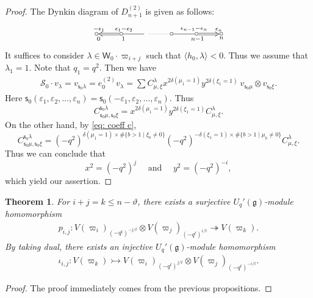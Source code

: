 \documentclass[11pt, leqno]{amsart}
\newtheorem{theorem}{Theorem}[section]
\theoremstyle{definition}
\numberwithin{equation}{section}
\begin{document}
\begin{proof}
The Dynkin diagram of $D^{(2)}_{n+1}$ is given as follows:
$$
\xymatrix@R=3ex{ *{\circ}<3pt> \ar@{<=}[r]_<{0}^{  -\epsilon_1
\qquad \ }  &*{\circ}<3pt> \ar@{-}[r]_<{1}^{\epsilon_1-\epsilon_2
\qquad \ }    & {} \ar@{.}[r] & *{\circ}<3pt> \ar@{-}[r]_>{\,\,\,\
n-1}^{ \qquad \ \epsilon_{n-1}-\epsilon_{n} }
&*{\circ}<3pt>\ar@{=>}[r]_>{\,\,\,\,n}^{ \qquad \  \epsilon_{n} }
&*{\circ}<3pt> }
$$
It suffices to consider $\lambda \in \mathsf{W}_0 \cdot {\varpi}_{i+j}$ such that
$\langle h_0, \lambda \rangle <0$. Thus we assume that $\lambda_1=1$. Note that $q_1=q^2$. Then
we have
\begin{align*}
\mathcal{S}_0 \cdot v_\lambda=v_{{\mathsf{s}}_0 \lambda}  = e_0^{(2)} v_\lambda = \sum C^{\lambda}_{\mu,\xi}
x^{2\delta(\mu_1=1)}y^{2\delta(\xi_1=1)} \ v_{{\mathsf{s}}_0 \mu} \otimes
v_{{\mathsf{s}}_0\xi}.
\end{align*}
Here ${\mathsf{s}}_0(\varepsilon_1,\varepsilon_2,\ldots,\varepsilon_n)=
{\mathsf{s}}_0(-\varepsilon_1,\varepsilon_2,\ldots,\varepsilon_n)$. Thus
$$ C^{{\mathsf{s}}_0\lambda}_{{\mathsf{s}}_0\mu,{\mathsf{s}}_0\xi} = x^{2\delta(\mu_1=1)}y^{2\delta(\xi_1=1)} C^{\lambda}_{\mu,\xi}.$$
On the other hand, by \eqref{eq: coeff c},
$$ C^{{\mathsf{s}}_0\lambda}_{{\mathsf{s}}_0\mu,{\mathsf{s}}_0\xi}  = {(-q^2)}^{\delta(\mu_1=1) \times \# \{ b>1 \mid \xi_b \ne 0  \}
} {(-q^2)}^{-\delta(\xi_1=1) \times \# \{ b>1 \mid \mu_b \ne 0  \} }
C^{\lambda}_{\mu,\xi}.$$ Thus we can conclude that
$$x^2 = {(-q^2)}^{j} \quad \text{ and } \quad y^2 = {(-q^2)}^{-i},$$
which yield our assertion.
\end{proof}

\begin{theorem} \label{thm: pij iota ij 1}
For $i+j=k \le n-\vartheta$, there exists a surjective $U_q'({\mathfrak g})$-module homomorphism
\begin{align} \label{eq: p ij}
  p_{i,j} \colon V(\varpi_i)_{(-q^t)^{-j/t}} \otimes V(\varpi_j)_{(-q^t)^{i/t}}
  \twoheadrightarrow V(\varpi_{k}).
  \end{align}
By taking dual, there exists an injective $U_q'({\mathfrak g})$-module homomorphism
\begin{align}\label{eq: iota ij}
  \iota_{i,j} \colon V(\varpi_k)  \rightarrowtail V(\varpi_i)_{(-q^t)^{j/t}}
  \otimes V(\varpi_j)_{(-q^t)^{-i/t}}.
  \end{align}
\end{theorem}
\begin{proof}The proof immediately comes from the previous propositions.
\end{proof}
\end{document}
